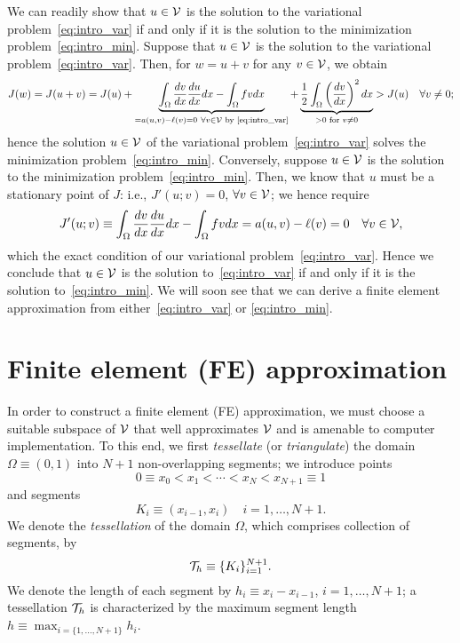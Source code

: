 We can readily show that $u \in \mathcal{V}$ is the solution to the variational problem~\eqref{eq:intro_var} if and only if it is the solution to the minimization problem~\eqref{eq:intro_min}.  Suppose that $u \in \mathcal{V}$ is the solution to the variational problem~\eqref{eq:intro_var}.  Then, for $w = u + v$ for any $v \in \mathcal{V}$, we obtain
\begin{align*}
  J(w) = J(u + v) = J(u) + \underbrace{ \int_{\Omega} \frac{d v}{d x} \frac{d u}{d x} dx - \int_\Omega f v dx}_{= a(u,v) - \ell(v) = 0 \ \forall v \in \mathcal{V} \text{ by \eqref{eq:intro_var}}}
  + \underbrace{ \frac{1}{2} \int_{\Omega} \left( \frac{d v}{d x} \right)^2 dx }_{> 0 \text{ for } v \neq 0} > J(u) \quad \forall v \neq 0;
\end{align*}
hence the solution $u \in \mathcal{V}$ of the variational problem~\eqref{eq:intro_var} solves the minimization problem~\eqref{eq:intro_min}. 
Conversely, suppose $u \in \mathcal{V}$ is the solution to the minimization problem~\eqref{eq:intro_min}.  Then, we know that $u$ must be a stationary point of $J$: i.e., $J'(u;v) = 0$, $\forall v \in \mathcal{V}$; we hence require
\begin{equation*}
  J'(u;v) \equiv
  \int_{\Omega} \frac{d v}{d x} \frac{d u}{d x} dx
  - \int_{\Omega} f v dx
  = a(u,v) - \ell(v) = 0 \quad \forall v \in \mathcal{V},
\end{equation*}
which the exact condition of our variational problem~\eqref{eq:intro_var}. Hence we conclude that $u \in \mathcal{V}$ is the solution to~\eqref{eq:intro_var} if and only if it is the solution to~\eqref{eq:intro_min}.  We will soon see that we can derive a finite element approximation from either~\eqref{eq:intro_var} or \eqref{eq:intro_min}.

\section{Finite element (FE) approximation}
In order to construct a finite element (FE) approximation, we must choose a suitable subspace of $\mathcal{V}$ that well approximates $\mathcal{V}$ and is amenable to computer implementation. To this end, we first \emph{tessellate} (or \emph{triangulate}) the domain $\Omega \equiv (0,1)$ into $N+1$ non-overlapping segments; we introduce points
\begin{equation*}
  0 \equiv x_0 < x_1 < \cdots < x_N < x_{N+1} \equiv 1
\end{equation*}
and segments
\begin{equation*}
  K_i \equiv (x_{i-1}, x_i) \quad i = 1,\dots,N+1.
\end{equation*}
We denote the \emph{tessellation} of the domain $\Omega$, which comprises collection of segments, by
\begin{equation}
  \mathcal{T}_h \equiv \{ K_i \}_{i=1}^{N+1}.
  \label{eq:intro_Th}
\end{equation}
We denote the length of each segment by $h_i \equiv x_i - x_{i-1}$, $i = 1,\dots,N+1$; a tessellation $\mathcal{T}_h$ is characterized by the maximum segment length $h \equiv \max_{i=\{ 1,\dots,N+1\}} h_i$.

